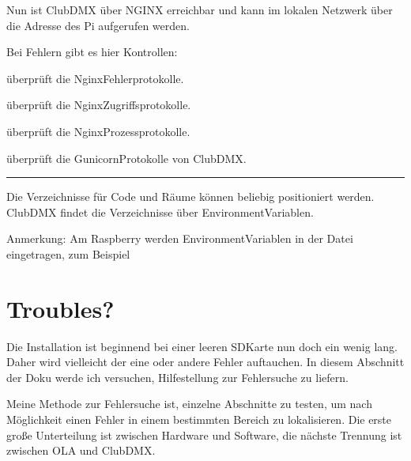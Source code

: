 \documentclass[letterpaper,10pt,ngerman]{sphinxmanual}
\begin{document}
Nun ist ClubDMX über NGINX erreichbar und kann im lokalen Netzwerk über
die Adresse des Pi aufgerufen werden.

Bei Fehlern  gibt es hier Kontrollen:

 überprüft die Nginx\sphinxhyphen{}Fehlerprotokolle.

 überprüft die Nginx\sphinxhyphen{}Zugriffsprotokolle.

 überprüft die Nginx\sphinxhyphen{}Prozessprotokolle.

 überprüft die Gunicorn\sphinxhyphen{}Protokolle von ClubDMX.


\bigskip\hrule\bigskip



Die Verzeichnisse für Code und Räume können beliebig positioniert werden.
ClubDMX findet die Verzeichnisse über Environment\sphinxhyphen{}Variablen.

\begin{sphinxVerbatim}[commandchars=\\\{\}]
\end{sphinxVerbatim}

Anmerkung: Am Raspberry werden Environment\sphinxhyphen{}Variablen in der Datei
  eingetragen, zum Beispiel



\section{Troubles?}
\label{\detokenize{raspberry:troubles}}
Die Installation ist \sphinxhyphen{} beginnend bei einer leeren SD\sphinxhyphen{}Karte \sphinxhyphen{} nun doch ein
wenig lang. Daher wird vielleicht der eine oder andere Fehler auftauchen.
In diesem Abschnitt der Doku werde ich versuchen, Hilfestellung zur
Fehlersuche zu liefern.

Meine Methode zur Fehlersuche ist, einzelne Abschnitte zu testen, um nach
Möglichkeit einen Fehler in einem bestimmten Bereich zu lokalisieren.
Die erste große Unterteilung ist zwischen Hardware und Software,
die nächste Trennung ist zwischen OLA und ClubDMX.
\end{document}
